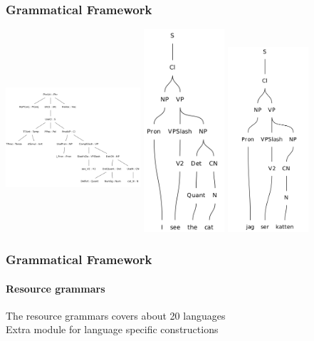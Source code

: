 \documentclass[10pt]{beamer}
\begin{document}
\begin{frame}
  \frametitle{Grammatical Framework}
\includegraphics[width=50mm,height=70mm]{gfTree.png}
\includegraphics[width=30mm]{gfETree.png}
\includegraphics[width=30mm]{gfSTree.png}
 \end{frame}

 \begin{frame}
  \frametitle{Grammatical Framework}
  \framesubtitle{Resource grammars}
  The resource grammars covers about 20 languages \\
  \vspace{5mm}
  \pause
  Extra module for language specific constructions
 \end{frame}
\end{document}
